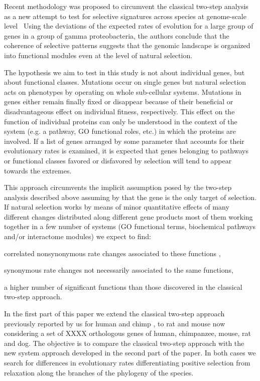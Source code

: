 Recent methodology was proposed to circumvent the classical two-step analysis as a new attempt to test for selective signatures across species at genome-scale level~\cite{Shapiro2008} Using the deviations of the expected rates of evolution for a large group of genes in a group of gamma proteobacteria, the authors conclude that the coherence of selective patterns suggests that the genomic landscape is organized into functional modules even at the level of natural selection.

The hypothesis we aim to test in this study is not about individual genes, but about functional classes. Mutations occur on single genes but natural selection acts on phenotypes by operating on whole sub-cellular systems. Mutations in genes either remain finally fixed or disappear because of their beneficial or disadvantageous effect on individual fitness, respectively. This effect on the function of individual proteins can only be understood in the context of the system (e.g. a pathway, GO functional roles, etc.) in which the proteins are involved. If a list of genes arranged by some parameter that accounts for their evolutionary rates is examined, it is expected that genes belonging to pathways or functional classes favored or disfavored by selection will tend to appear towards the extremes.

This approach circumvents the implicit assumption posed by the two-step analysis described above assuming by that the gene is the only target of selection. If natural selection works by means of minor quantitative effects of many different changes distributed along different gene products most of them working together in a few number of systems (GO functional terms, biochemical pathways and/or interactome modules) we expect to find: \begin{inparaenum}[ 1-] \item correlated nonsynonymous rate changes associated to these functions , \item synonymous rate changes not necessarily associated to the same functions, \item a higher number of significant functions than those discovered in the classical two-step approach.\end{inparaenum}

In the first part of this paper we extend the classical two-step approach previously reported by us for human and chimp \cite{Arbiza2006}, to rat and mouse now considering a set of XXXX orthologous genes of human, chimpanzee, mouse, rat and dog. The objective is to compare the classical two-step approach with the new system approach developed in the second part of the paper. In both cases we search for differences in evolutionary rates differentiating positive selection from relaxation along the branches of the phylogeny of the species.

